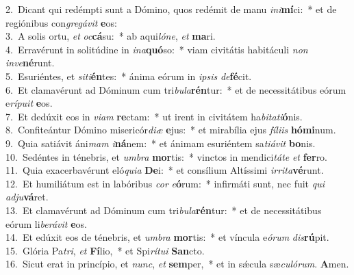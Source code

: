 {2.~}Dicant qui redémpti sunt a Dómino, quos redémit de manu \textit{i}\textit{ni}\textbf{mí}ci:~* et de regiónibus con\textit{gre}\textit{gá}\textit{vit} \textbf{e}os:\\
{3.~}A solis ortu, \textit{et} \textit{oc}\textbf{cá}su:~* ab aqui\textit{ló}\textit{ne}, \textit{et} \textbf{ma}ri.\\
{4.~}Erravérunt in solitúdine in \textit{i}\textit{na}\textbf{quó}so:~* viam civitátis habitáculi \textit{non} \textit{in}\textit{ve}\textbf{né}runt.\\
{5.~}Esuriéntes, et \textit{si}\textit{ti}\textbf{én}tes:~* ánima eórum in \textit{i}\textit{psis} \textit{de}\textbf{fé}cit.\\
{6.~}Et clamavérunt ad Dóminum cum tri\textit{bu}\textit{la}\textbf{rén}tur:~* et de necessitátibus eórum e\textit{rí}\textit{pu}\textit{it} \textbf{e}os.\\
{7.~}Et dedúxit eos in \textit{vi}\textit{am} \textbf{re}ctam:~* ut irent in civitátem ha\textit{bi}\textit{ta}\textit{ti}\textbf{ó}nis.\\
{8.~}Confiteántur Dómino misericór\textit{di}\textit{æ} \textbf{e}jus:~* et mirabília ejus \textit{fí}\textit{li}\textit{is} \textbf{hó}\textbf{mi}num.\\
{9.~}Quia satiávit áni\textit{mam} \textit{i}\textbf{ná}nem:~* et ánimam esuriéntem sa\textit{ti}\textit{á}\textit{vit} \textbf{bo}nis.\\
{10.~}Sedéntes in ténebris, et \textit{um}\textit{bra} \textbf{mor}tis:~* vinctos in mendici\textit{tá}\textit{te} \textit{et} \textbf{fer}ro.\\
{11.~}Quia exacerbavérunt eló\textit{qui}\textit{a} \textbf{De}i:~* et consílium Altíssimi \textit{ir}\textit{ri}\textit{ta}\textbf{vé}runt.\\
{12.~}Et humiliátum est in labóribus \textit{cor} \textit{e}\textbf{ó}rum:~* infirmáti sunt, nec fuit \textit{qui} \textit{ad}\textit{ju}\textbf{vá}ret.\\
{13.~}Et clamavérunt ad Dóminum cum tri\textit{bu}\textit{la}\textbf{rén}tur:~* et de necessitátibus eórum li\textit{be}\textit{rá}\textit{vit} \textbf{e}os.\\
{14.~}Et edúxit eos de ténebris, et \textit{um}\textit{bra} \textbf{mor}tis:~* et víncula e\textit{ó}\textit{rum} \textit{dis}\textbf{rú}pit.\\
{15.~}Glória Pa\textit{tri}, \textit{et} \textbf{Fí}lio,~* et Spi\textit{rí}\textit{tu}\textit{i} \textbf{San}cto.\\
{16.~}Sicut erat in princípio, et \textit{nunc}, \textit{et} \textbf{sem}per,~* et in sǽcula sæ\textit{cu}\textit{ló}\textit{rum}. \textbf{A}men.\\
